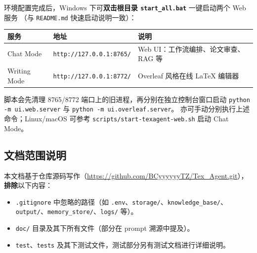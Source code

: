 \documentclass[12pt,a4paper]{ctexart}
\begin{document}
环境配置完成后，Windows 下可\textbf{双击根目录 \texttt{start\_all.bat}} 一键启动两个 Web 服务
（与 \texttt{README.md} 快速启动说明一致）：

\begin{longtable}{@{}p{}p{}p{}@{}}
\toprule
\textbf{服务} & \textbf{地址} & \textbf{说明} \\
\midrule
\endhead
Chat Mode & \texttt{http://127.0.0.1:8765/} & Web UI：工作流编排、论文审查、RAG 等 \\
Writing Mode & \texttt{http://127.0.0.1:8772/} & Overleaf 风格在线 LaTeX 编辑器 \\
\bottomrule
\end{longtable}

\noindent 脚本会先清理 8765/8772 端口上的旧进程，再分别在独立控制台窗口启动
\texttt{python -m ui.web.server} 与 \texttt{python -m ui.overleaf.server}。
亦可手动分别执行上述命令；Linux/macOS 可参考 \texttt{scripts/start-texagent-web.sh} 启动 Chat Mode。

\subsection{文档范围说明}

本文档基于仓库源码写作（\url{https://github.com/BCyyyyyyTZ/Tex_Agent.git}），\textbf{排除}以下内容：
\begin{itemize}[leftmargin=2em]
    \item \texttt{.gitignore} 中忽略的路径（如 \texttt{.env}、\texttt{storage/}、\texttt{knowledge\_base/}、\texttt{output/}、\texttt{memory\_store/}、\texttt{logs/} 等）。
    \item \texttt{doc/} 目录及其下所有文件（部分在 prompt 溯源中提及）。
    \item \texttt{test}、\texttt{tests} 及其下测试文件，测试部分另有测试文档进行详细说明。
\end{itemize}
















\end{document}
